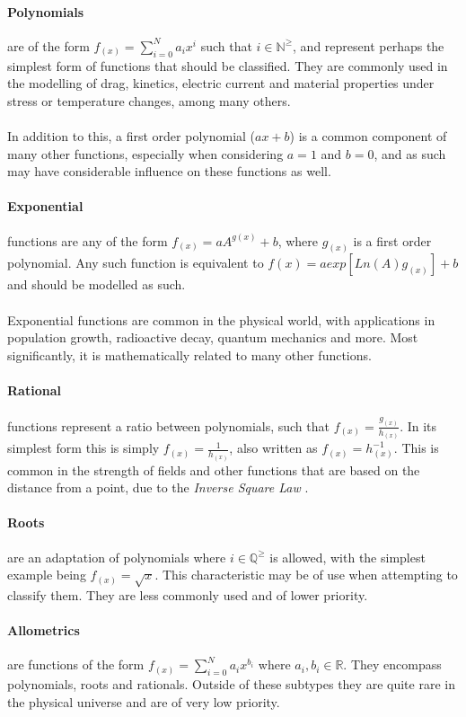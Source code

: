 \documentclass[main.tex]{subfiles}
\begin{document}
      \paragraph{Polynomials} are of the form $f_{(x)}=\sum_{i=0}^{N} a_i x^i$ such that $i \in \mathbb{N}^\geq$, and represent perhaps the simplest form of functions that should be classified. They are commonly used in the modelling of drag, kinetics, electric current and material properties under stress or temperature changes, among many others. 
      \\\\
      In addition to this, a first order polynomial ($a x + b$) is a common component of many other functions, especially when considering $a=1$ and $b=0$, and as such may have considerable influence on these functions as well.
      \paragraph{Exponential} functions are any of the form $f_{(x)}= a A^{g(x)} + b$, where $g_{(x)}$ is a first order polynomial. Any such function is equivalent to $ f{(x)} =  a exp[  Ln(A) g_{(x)}  ] +b $ and should be modelled as such. 
      \\\\
      Exponential functions are common in the physical world, with applications in population growth, radioactive decay, quantum mechanics and more. Most significantly, it is mathematically related to many other functions.
      \paragraph{Rational} functions represent a ratio between polynomials, such that $f_{(x)}=\frac{g_{(x)}}{h_{(x)}}$. In its simplest form this is simply $f_{(x)}=\frac{1}{h_{(x)}}$, also written as $f_{(x)}=h_{(x)}^{-1}$. This is common in the strength of fields and other functions that are based on the distance from a point, due to the \textit{Inverse Square Law} \cite{}. 
      \paragraph{Roots} are an adaptation of polynomials where $i \in \mathbb{Q}^\geq$ is allowed, with the simplest example being $f_{(x)}=\sqrt{x}$. This characteristic may be of use when attempting to classify them. They are less commonly used and of lower priority.
      \paragraph{Allometrics} are functions of the form $f_{(x)}=\sum_{i=0}^{N} a_i x^{b_i} $ where $a_i,b_i \in \mathbb{R}$. They encompass polynomials, roots and rationals. Outside of these subtypes they are quite rare in the physical universe and are of very low priority.
    
\end{document}
